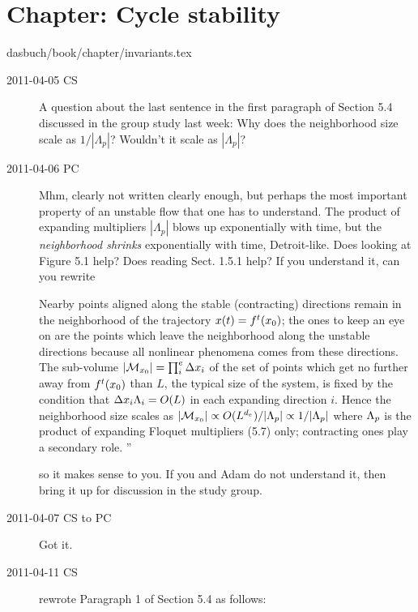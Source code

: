 \section{Chapter: Cycle stability}
\label{c-invariants}\noindent dasbuch/book/chapter/invariants.tex
\begin{description}

\item[2011-04-05 CS]
    A question about the last sentence in the first paragraph of Section
    5.4  discussed in the group study last week: Why does the
    neighborhood size scale as $1/|\Lambda_{p}|$? Wouldn't it scale as
    $|\Lambda_{p}|$?

\item[2011-04-06 PC] Mhm, clearly not written clearly enough, but
perhaps the most important property of an unstable flow
that one has to understand. The product of expanding multipliers
$|\Lambda_{p}|$ blows up exponentially with time, but the
\emph{neighborhood shrinks} exponentially with time, Detroit-like.
 Does looking
at Figure 5.1 help? Does reading Sect. 1.5.1 help? If you understand it,
can you rewrite

                                                    \toCB
Nearby points aligned along the stable
(contracting) directions  remain in the neighborhood of the
trajectory $x(t)= {f^{t}({x_0})}$; the ones to keep an eye
on are the points which leave the neighborhood along the
unstable directions because all nonlinear phenomena comes
from these directions. The sub-volume $ |{\cal M}_{{x_0}}| = \prod_i^e\Delta
x_i$ of the set of points which get no further away from
${f^{t}({x_0})}$ than $L$, the typical size of the system, is
fixed by the condition that $\Delta x_i \Lambda_i = O(L)$
in each expanding direction $i$. Hence the neighborhood size
scales as
$|{\cal M}_{{x_0}}| \propto O(L^{d_e})/|\Lambda_p| \propto 1/|\Lambda_p| $
where $\Lambda_p$ is the
product of expanding Floquet multipliers
(5.7) %
only;
contracting ones play a secondary role.
''

so it makes sense to you. If you and Adam do not understand it, then
bring it up for discussion in the study group.

\item[2011-04-07 CS to PC] Got it.

\item[2011-04-11 CS]
rewrote Paragraph 1 of Section 5.4 as follows:


\end{description}
